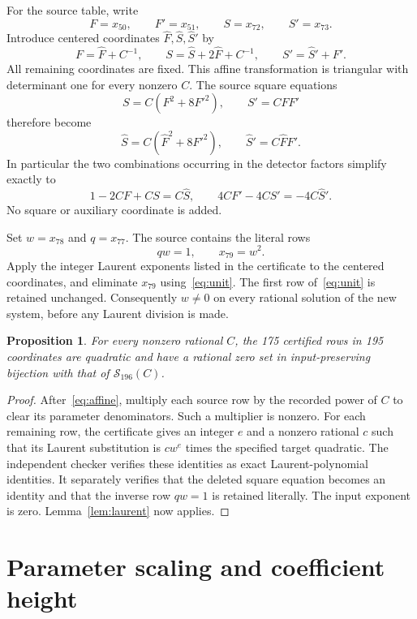 \documentclass[11pt,a4paper]{article}
\newtheorem{proposition}[theorem]{Proposition}
\begin{document}
For the source table, write
\[
 F=x_{50},\qquad F'=x_{51},\qquad
 S=x_{72},\qquad S'=x_{73}.
\]
Introduce centered coordinates $\widehat F,\widehat S,\widehat S'$ by
\begin{equation}\label{eq:affine}
 F=\widehat F+C^{-1},\qquad
 S=\widehat S+2\widehat F+C^{-1},\qquad
 S'=\widehat S'+F'.
\end{equation}
All remaining coordinates are fixed. This affine transformation is
triangular with determinant one for every nonzero $C$.
The source square equations
\[
 S=C(F^2+8F'^2),\qquad S'=CFF'
\]
therefore become
\[
 \widehat S=C(\widehat F^2+8F'^2),\qquad
 \widehat S'=C\widehat F F'.
\]
In particular the two combinations occurring in the detector factors
simplify exactly to
\[
 1-2CF+CS=C\widehat S,\qquad
 4CF'-4CS'=-4C\widehat S'.
\]
No square or auxiliary coordinate is added.

Set $w=x_{78}$ and $q=x_{77}$. The source contains the literal rows
\begin{equation}\label{eq:unit}
 qw=1,\qquad x_{79}=w^2.
\end{equation}
Apply the integer Laurent exponents listed in the certificate to the
centered coordinates, and eliminate $x_{79}$ using~\eqref{eq:unit}.
The first row of~\eqref{eq:unit} is retained unchanged. Consequently
$w\ne0$ on every rational solution of the new system, before any
Laurent division is made.

\begin{proposition}\label{prop:algebra}
For every nonzero rational $C$, the 175 certified rows in 195
coordinates are quadratic and have a rational zero set in
input-preserving bijection with that of $\mathcal S_{196}(C)$.
\end{proposition}

\begin{proof}
After~\eqref{eq:affine}, multiply each source row by the recorded
power of $C$ to clear its parameter denominators. Such a multiplier
is nonzero. For each remaining row, the certificate gives an integer
$e$ and a nonzero rational $c$ such that its Laurent substitution is
$cw^e$ times the specified target quadratic. The independent checker
verifies these identities as exact Laurent-polynomial identities.
It separately verifies that the deleted square equation becomes an
identity and that the inverse row $qw=1$ is retained literally.
The input exponent is zero. Lemma~\ref{lem:laurent} now applies.
\end{proof}

\section{Parameter scaling and coefficient height}
\end{document}
